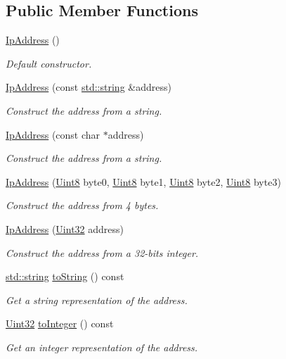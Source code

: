 \subsection*{Public Member Functions}
\begin{DoxyCompactItemize}
\item 
\hyperlink{classsf_1_1_ip_address_af32a0574baa0f46e48deb2d83ca7658b}{Ip\-Address} ()
\begin{DoxyCompactList}\small\item\em Default constructor. \end{DoxyCompactList}\item 
\hyperlink{classsf_1_1_ip_address_a656b7445ab04cabaa7398685bc09c3f7}{Ip\-Address} (const \hyperlink{gl3_8h_ac83513893df92266f79a515488701770}{std\-::string} \&address)
\begin{DoxyCompactList}\small\item\em Construct the address from a string. \end{DoxyCompactList}\item 
\hyperlink{classsf_1_1_ip_address_a92f2a9be74334a61b96c2fc79fe6eb78}{Ip\-Address} (const char $\ast$address)
\begin{DoxyCompactList}\small\item\em Construct the address from a string. \end{DoxyCompactList}\item 
\hyperlink{classsf_1_1_ip_address_a1d289dcb9ce7a64c600c6f84cba88cc6}{Ip\-Address} (\hyperlink{namespacesf_a4ef3d630785c4f296f9b4f274c33d78e}{Uint8} byte0, \hyperlink{namespacesf_a4ef3d630785c4f296f9b4f274c33d78e}{Uint8} byte1, \hyperlink{namespacesf_a4ef3d630785c4f296f9b4f274c33d78e}{Uint8} byte2, \hyperlink{namespacesf_a4ef3d630785c4f296f9b4f274c33d78e}{Uint8} byte3)
\begin{DoxyCompactList}\small\item\em Construct the address from 4 bytes. \end{DoxyCompactList}\item 
\hyperlink{classsf_1_1_ip_address_a8ed34ba3a40d70eb9f09ac5ae779a162}{Ip\-Address} (\hyperlink{namespacesf_aa746fb1ddef4410bddf198ebb27e727c}{Uint32} address)
\begin{DoxyCompactList}\small\item\em Construct the address from a 32-\/bits integer. \end{DoxyCompactList}\item 
\hyperlink{gl3_8h_ac83513893df92266f79a515488701770}{std\-::string} \hyperlink{classsf_1_1_ip_address_a52f4be92fb0ceb689abc469e4a85fd82}{to\-String} () const 
\begin{DoxyCompactList}\small\item\em Get a string representation of the address. \end{DoxyCompactList}\item 
\hyperlink{namespacesf_aa746fb1ddef4410bddf198ebb27e727c}{Uint32} \hyperlink{classsf_1_1_ip_address_af42678b08b23def2560aed7d98b24d89}{to\-Integer} () const 
\begin{DoxyCompactList}\small\item\em Get an integer representation of the address. \end{DoxyCompactList}\end{DoxyCompactItemize}
